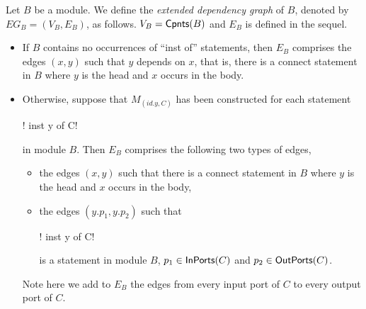 {\begin{itemize}
Let $B$ be a module. We define the \emph{extended dependency graph} of $B$, denoted by $EG_B = (V_B, E_B)$, as follows. $V_B = {\sf Cpnts}(B)$ and $E_B$ is defined in the sequel.
\begin{itemize}
\item If $B$ contains no occurrences of ``inst of'' statements, then $E_B$ comprises the edges $(x, y)$ such that $y$ depends on $x$, that is, there is a connect statement in $B$ where $y$ is the head and $x$ occurs in the body.
%
\item Otherwise, suppose that $M_{(id.y, C)}$ has been constructed for each statement \begin{lstinline}! inst y of C!\end{lstinline} in module $B$. Then
$E_B$ comprises the following two types of edges,
\begin{itemize}
\item the edges $(x, y)$ such that there is a connect statement in $B$ where $y$ is the head and $x$ occurs in the body,
%
\item the edges $(y.p_1, y.p_2)$ such that \begin{lstinline}! inst y of C!\end{lstinline} is a  statement in module $B$, $p_1 \in {\sf InPorts}(C)$ and $p_2 \in {\sf OutPorts}(C)$.
\end{itemize}
Note here we add to $E_B$ the edges from every input port of $C$ to every output port of $C$.
\end{itemize}


\end{itemize}}
